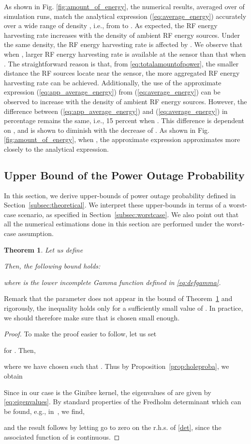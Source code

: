 \documentclass[12pt,draftclsnofoot,onecolumn]{IEEEtran}
\newtheorem{theorem}{Theorem}
\begin{document}
As shown in Fig. \ref{fig:amount_of_energy}, the numerical results, averaged over  of simulation runs, match the analytical expression (\ref{eq:average_energy}) accurately over a wide range of density , i.e., from  to . As expected, the RF energy harvesting rate increases with the density of ambient RF energy sources. Under the same density, the RF energy harvesting rate is affected by . We observe that when , larger RF energy harvesting rate is available at the sensor than that when . The straightforward reason is that, from \eqref{eq:totalamountofpower}, the smaller distance the RF sources locate near the sensor, the more aggregated RF energy harvesting rate can be achieved. Additionally, the use of the approximate expression (\ref{eq:app_average_energy}) from (\ref{eq:average_energy}) can be observed to increase with the density of ambient RF energy sources. However, the difference between (\ref{eq:app_average_energy}) and (\ref{eq:average_energy}) in percentage remains the same, i.e., 15 percent when . This difference is dependent on , and is shown to diminish with the decrease of . As shown in Fig. \ref{fig:amount_of_energy}, when , the approximate expression approximates more closely to the analytical expression.  

\subsection{Upper Bound of the Power Outage Probability}
 \label{sec:upperboundpoutage}
 
In this section, we derive upper-bounds of power outage probability defined in Section~\ref{subsec:theoretical}. We interpret these upper-bounds in terms of a worst-case scenario, as specified in Section~\ref{subsec:worstcase}. We also point out that all the numerical estimations done in this section are performed under the worst-case assumption. 

\begin{theorem}
\label{thm:estimationphi}
Let us define 

Then, the following bound holds:

where  is the lower incomplete Gamma function defined in \eqref{eq:defgamma}.
\end{theorem}
Remark that the parameter  does not appear in the bound of Theorem~\ref{thm:estimationphi} and rigorously, the inequality holds only for a sufficiently small value of . In practice, we should therefore make sure that  is chosen small enough.
\begin{proof}
To make the proof easier to follow, let us set

for . Then,

where we have chosen  such that . Thus by Proposition~\ref{prop:holeproba}, we obtain

Since in our case  is the Ginibre kernel, the eigenvalues of  are given by \eqref{eq:eigenvalues}. By standard properties of the Fredholm determinant which can be found, e.g., in~\cite{Brezis}, we find,

and the result follows by letting  go to zero on the r.h.s. of \eqref{det}, since the associated function of  is continuous.
\end{proof}
\end{document}
